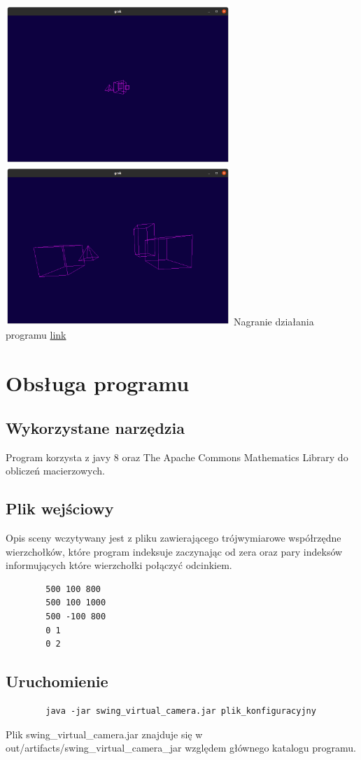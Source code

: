 \documentclass[11pt]{article}
\begin{document}
\includegraphics[width=8.5cm]{5.png}
\includegraphics[width=8.5cm]{7.png}
Nagranie działania programu \href{https://youtu.be/Wztjls1sywg}{\color{blue}link}
\section{Obsługa programu}
\subsection{Wykorzystane narzędzia}
Program korzysta z javy 8 oraz The Apache Commons Mathematics Library
do obliczeń macierzowych.
\subsection{Plik wejściowy}
Opis sceny wczytywany jest z pliku zawierającego trójwymiarowe współrzędne wierzchołków, 
które program indeksuje zaczynając od zera oraz pary indeksów informujących 
które wierzchołki połączyć odcinkiem.
    \begin{verbatim}
        500 100 800
        500 100 1000
        500 -100 800
        0 1
        0 2
    \end{verbatim}
\subsection{Uruchomienie}
    \begin{verbatim}
        java -jar swing_virtual_camera.jar plik_konfiguracyjny
    \end{verbatim}
    Plik swing\_virtual\_camera.jar znajduje się w 
    out/artifacts/swing\_virtual\_camera\_jar
    względem głównego katalogu programu.
\end{document}
